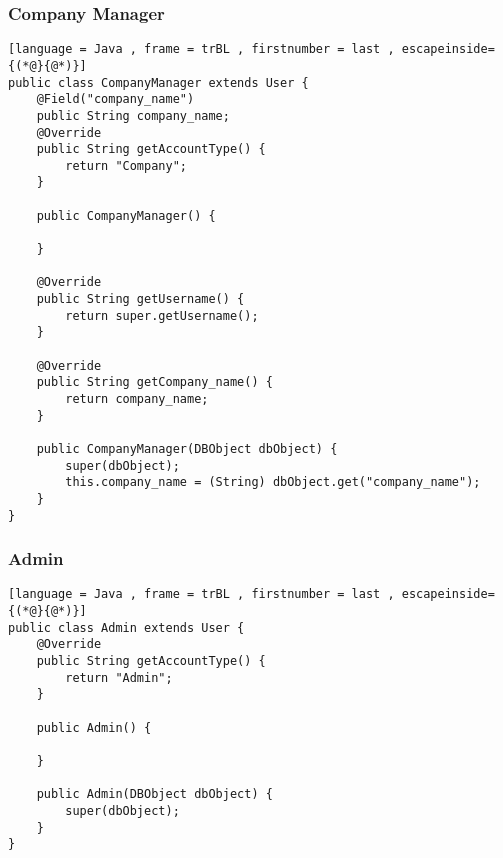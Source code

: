 \subsubsection{Company Manager}
\begin{lstlisting}[language = Java , frame = trBL , firstnumber = last , escapeinside={(*@}{@*)}]
public class CompanyManager extends User {
    @Field("company_name")
    public String company_name;
    @Override 
    public String getAccountType() {
        return "Company";
    }

    public CompanyManager() {

    }

    @Override
    public String getUsername() {
        return super.getUsername();
    }

    @Override
    public String getCompany_name() {
        return company_name;
    }

    public CompanyManager(DBObject dbObject) {
        super(dbObject);
        this.company_name = (String) dbObject.get("company_name");
    }
}
\end{lstlisting}
\subsubsection{Admin}
\begin{lstlisting}[language = Java , frame = trBL , firstnumber = last , escapeinside={(*@}{@*)}]
public class Admin extends User {
    @Override
    public String getAccountType() {
        return "Admin";
    }

    public Admin() {

    }

    public Admin(DBObject dbObject) {
        super(dbObject);
    }
}

\end{lstlisting}

